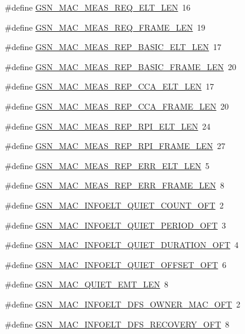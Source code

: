\begin{DoxyCompactItemize}
\#define \hyperlink{a00523_a7a88cdbd5c92f5f8fe480750de90ec80}{GSN\_\-MAC\_\-MEAS\_\-REQ\_\-ELT\_\-LEN}~16
\item 
\#define \hyperlink{a00523_ac1906e59af83c227fc7e54ef5b4a6d27}{GSN\_\-MAC\_\-MEAS\_\-REQ\_\-FRAME\_\-LEN}~19
\item 
\#define \hyperlink{a00523_a70d8b670b47e1035bc777c6b4b20b3ec}{GSN\_\-MAC\_\-MEAS\_\-REP\_\-BASIC\_\-ELT\_\-LEN}~17
\item 
\#define \hyperlink{a00523_a8624df2104ab4caf81d2fe43d79fe8a2}{GSN\_\-MAC\_\-MEAS\_\-REP\_\-BASIC\_\-FRAME\_\-LEN}~20
\item 
\#define \hyperlink{a00523_a98697fbd5a948c64a0e72eb11e4d3741}{GSN\_\-MAC\_\-MEAS\_\-REP\_\-CCA\_\-ELT\_\-LEN}~17
\item 
\#define \hyperlink{a00523_ad28ce435f895e4eb008cbe50d0bd06f8}{GSN\_\-MAC\_\-MEAS\_\-REP\_\-CCA\_\-FRAME\_\-LEN}~20
\item 
\#define \hyperlink{a00523_acf84a08277e5da07758077f7c4894cbc}{GSN\_\-MAC\_\-MEAS\_\-REP\_\-RPI\_\-ELT\_\-LEN}~24
\item 
\#define \hyperlink{a00523_af9ae13b48b9445506e87bf511be52bc3}{GSN\_\-MAC\_\-MEAS\_\-REP\_\-RPI\_\-FRAME\_\-LEN}~27
\item 
\#define \hyperlink{a00523_adc0de1bac500de6fa48e71a08ba5e4f8}{GSN\_\-MAC\_\-MEAS\_\-REP\_\-ERR\_\-ELT\_\-LEN}~5
\item 
\#define \hyperlink{a00523_a215aa0e7499b1a270f7a658da7a9fc27}{GSN\_\-MAC\_\-MEAS\_\-REP\_\-ERR\_\-FRAME\_\-LEN}~8
\item 
\#define \hyperlink{a00523_a9aa658f0d23aafdb605c4b85dd587041}{GSN\_\-MAC\_\-INFOELT\_\-QUIET\_\-COUNT\_\-OFT}~2
\item 
\#define \hyperlink{a00523_ab9fbf600f45fe3fd09df134e770de018}{GSN\_\-MAC\_\-INFOELT\_\-QUIET\_\-PERIOD\_\-OFT}~3
\item 
\#define \hyperlink{a00523_aba72612f641a456c210df6fcb2845c86}{GSN\_\-MAC\_\-INFOELT\_\-QUIET\_\-DURATION\_\-OFT}~4
\item 
\#define \hyperlink{a00523_a97154d3ebc3d3b16955261fcb8f2940f}{GSN\_\-MAC\_\-INFOELT\_\-QUIET\_\-OFFSET\_\-OFT}~6
\item 
\#define \hyperlink{a00523_ab647f722b5261c8ab6b5842c5ec8b2df}{GSN\_\-MAC\_\-QUIET\_\-EMT\_\-LEN}~8
\item 
\#define \hyperlink{a00523_abd2b280f14dcd35d31b4f4fa7213b0f5}{GSN\_\-MAC\_\-INFOELT\_\-DFS\_\-OWNER\_\-MAC\_\-OFT}~2
\item 
\#define \hyperlink{a00523_af11fb3dffc2748002211efe86d5d0fde}{GSN\_\-MAC\_\-INFOELT\_\-DFS\_\-RECOVERY\_\-OFT}~8

\end{DoxyCompactItemize}
